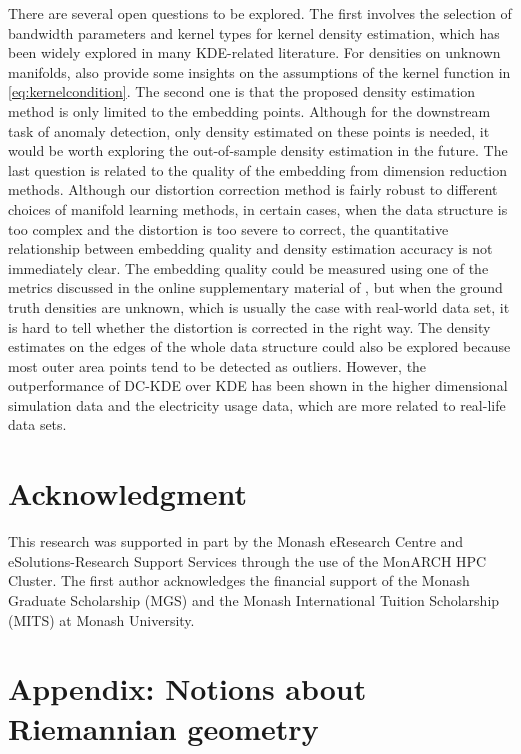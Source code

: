 \documentclass[11pt,a4paper,]{article}
\begin{document}
There are several open questions to be explored. The first involves the selection of bandwidth parameters and kernel types for kernel density estimation, which has been widely explored in many KDE-related literature. For densities on unknown manifolds, \textcite{Berenfeld2021-as} also provide some insights on the assumptions of the kernel function in \eqref{eq:kernelcondition}. The second one is that the proposed density estimation method is only limited to the embedding points. Although for the downstream task of anomaly detection, only density estimated on these points is needed, it would be worth exploring the out-of-sample density estimation in the future.
The last question is related to the quality of the embedding from dimension reduction methods. Although our distortion correction method is fairly robust to different choices of manifold learning methods, in certain cases, when the data structure is too complex and the distortion is too severe to correct, the quantitative relationship between embedding quality and density estimation accuracy is not immediately clear. The embedding quality could be measured using one of the metrics discussed in the online supplementary material of \textcite{Cheng2021-dh}, but when the ground truth densities are unknown, which is usually the case with real-world data set, it is hard to tell whether the distortion is corrected in the right way. The density estimates on the edges of the whole data structure could also be explored because most outer area points tend to be detected as outliers. However, the outperformance of DC-KDE over KDE has been shown in the higher dimensional simulation data and the electricity usage data, which are more related to real-life data sets.

\hypertarget{acknowledgment}{%
\section*{Acknowledgment}\label{acknowledgment}}

This research was supported in part by the Monash eResearch Centre and eSolutions-Research Support Services through the use of the MonARCH HPC Cluster. The first author acknowledges the financial support of the Monash Graduate Scholarship (MGS) and the Monash International Tuition Scholarship (MITS) at Monash University.

\appendix

\hypertarget{riemgeo}{%
\section{Appendix: Notions about Riemannian geometry}\label{riemgeo}}
\end{document}
